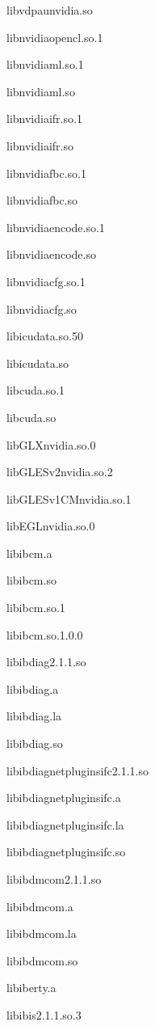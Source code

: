 \documentclass[letterpaper,10pt,english]{sphinxmanual}
\begin{document}
%
\begin{sphinxVerbatim}[commandchars=\\\{\}]
libvdpau\PYGZus{}nvidia.so

libnvidia\PYGZhy{}opencl.so.1

libnvidia\PYGZhy{}ml.so.1

libnvidia\PYGZhy{}ml.so

libnvidia\PYGZhy{}ifr.so.1

libnvidia\PYGZhy{}ifr.so

libnvidia\PYGZhy{}fbc.so.1

libnvidia\PYGZhy{}fbc.so

libnvidia\PYGZhy{}encode.so.1

libnvidia\PYGZhy{}encode.so

libnvidia\PYGZhy{}cfg.so.1

libnvidia\PYGZhy{}cfg.so

libicudata.so.50

libicudata.so

libcuda.so.1

libcuda.so

libGLX\PYGZus{}nvidia.so.0

libGLESv2\PYGZus{}nvidia.so.2

libGLESv1\PYGZus{}CM\PYGZus{}nvidia.so.1

libEGL\PYGZus{}nvidia.so.0

libibcm.a

libibcm.so

libibcm.so.1

libibcm.so.1.0.0

libibdiag\PYGZhy{}2.1.1.so

libibdiag.a

libibdiag.la

libibdiag.so

libibdiagnet\PYGZus{}plugins\PYGZus{}ifc\PYGZhy{}2.1.1.so

libibdiagnet\PYGZus{}plugins\PYGZus{}ifc.a

libibdiagnet\PYGZus{}plugins\PYGZus{}ifc.la

libibdiagnet\PYGZus{}plugins\PYGZus{}ifc.so

libibdmcom\PYGZhy{}2.1.1.so

libibdmcom.a

libibdmcom.la

libibdmcom.so

libiberty.a

libibis\PYGZhy{}2.1.1.so.3


\end{sphinxVerbatim}
\end{document}
